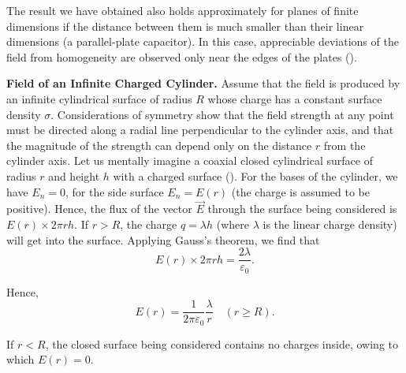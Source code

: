 The result we have obtained also holds approximately for planes of finite dimensions if the distance between them is much smaller than their linear dimensions (a parallel-plate capacitor). In this case, appreciable deviations of the field from homogeneity are observed only near the edges of the plates ().

\textbf{Field of an Infinite Charged Cylinder.} Assume that the field is produced by an infinite cylindrical surface of radius $R$ whose charge has a constant surface density $\sigma$. Considerations of symmetry show that the field strength at any point must be directed along a radial line perpendicular to the cylinder axis, and that the magnitude of the strength can depend only on the distance $r$ from the cylinder axis. Let us mentally imagine a coaxial closed cylindrical surface of radius $r$ and height $h$ with a charged surface (). For the bases of the cylinder, we have $E_n=0$, for the side surface $E_n=E(r)$ (the charge is assumed to be positive). Hence, the flux of the vector $\vec{E}$ through the surface being considered is $E(r)\times 2\pi rh$. If $r>R$, the charge $q=\lambda h$ (where $\lambda$ is the linear charge density) will get into the surface. Applying Gauss's theorem, we find that
\begin{equation*}
	E(r)\times 2\pi rh = \frac{2\lambda}{\varepsilon_0}.
\end{equation*}

\noindent
Hence,
\begin{equation}\label{eq:1_122}
	E(r) = \frac{1}{2\pi\varepsilon_0}\frac{\lambda}{r}\quad (r\geqslant R).
\end{equation}

\noindent
If $r<R$, the closed surface being considered contains no charges inside, owing to which $E(r)=0$.

